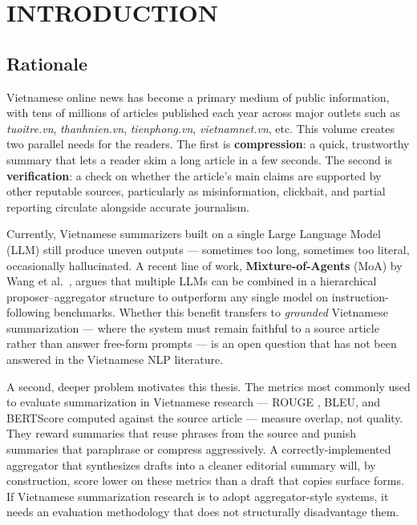 \chapter*{INTRODUCTION}

\section*{Rationale}

Vietnamese online news has become a primary medium of public information, with
tens of millions of articles published each year across major outlets such as
\textit{tuoitre.vn}, \textit{thanhnien.vn}, \textit{tienphong.vn},
\textit{vietnamnet.vn}, etc. This volume creates two parallel
needs for the readers. The first is \textbf{compression}: a quick,
trustworthy summary that lets a reader skim a long article in a few seconds.
The second is \textbf{verification}: a check on whether the article's main
claims are supported by other reputable sources, particularly as
misinformation, clickbait, and partial reporting circulate alongside accurate
journalism.

Currently, Vietnamese summarizers built on a single Large Language Model
(LLM) still produce uneven outputs --- sometimes too long, sometimes too
literal, occasionally hallucinated. A recent line of work,
\textbf{Mixture-of-Agents} (MoA) by Wang et al.\ \cite{Wang2024}, argues that
multiple LLMs can be combined in a hierarchical proposer--aggregator structure
to outperform any single model on instruction-following benchmarks. Whether
this benefit transfers to \textit{grounded} Vietnamese summarization --- where
the system must remain faithful to a source article rather than answer
free-form prompts --- is an open question that has not been answered in the
Vietnamese NLP literature.

A second, deeper problem motivates this thesis. The metrics most commonly used
to evaluate summarization in Vietnamese research --- ROUGE \cite{Lin2004},
BLEU, and BERTScore \cite{Zhang2020} computed against the source article ---
measure overlap, not quality. They reward summaries that reuse phrases from
the source and punish summaries that paraphrase or compress aggressively.
A correctly-implemented aggregator that synthesizes drafts into a cleaner
editorial summary will, by construction, score lower on these metrics than a
draft that copies surface forms. If Vietnamese summarization research is to
adopt aggregator-style systems, it needs an evaluation methodology that does
not structurally disadvantage them.

